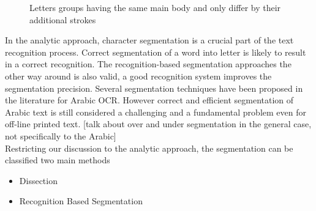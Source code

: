 \documentclass[12pt,journal,compsoc]{IEEEtran}
\begin{document}
\begin{figure}[h]
\centering
    \caption{
        Letters groups having the same main body and only differ by their additional strokes
     }
   \label{fig:same_main_body_letters}
\end{figure}

In the analytic approach, character segmentation is a crucial part of the text recognition process. Correct segmentation of a word into letter is likely to result in a correct recognition. The recognition-based segmentation approaches the other way around is also valid, a good recognition system improves the segmentation precision. Several segmentation techniques have been proposed in the literature for Arabic OCR. However correct and efficient segmentation of Arabic text is still considered a challenging and a fundamental problem even for off-line printed text.  
[talk about over and under segmentation in the general case, not specifically to the Arabic]\\


Restricting our discussion to the analytic approach, the segmentation can be classified two main methods
\begin{itemize}
  \item Dissection
  \item Recognition Based Segmentation
\end{itemize}
\end{document}
